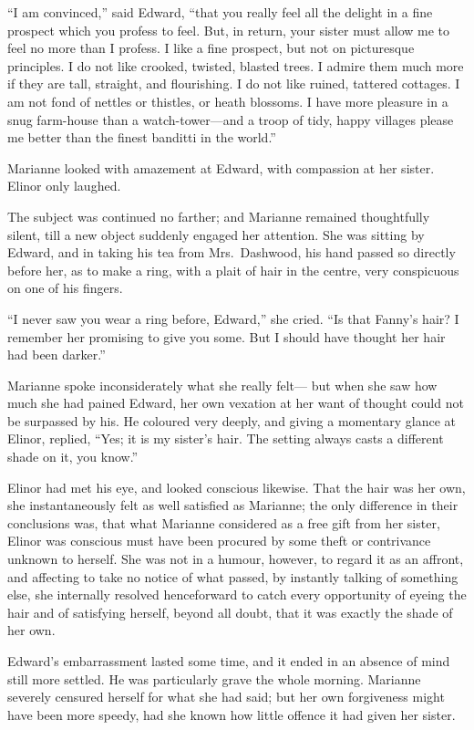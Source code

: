 ``I am convinced,'' said Edward, ``that you really feel
all the delight in a fine prospect which you profess
to feel.  But, in return, your sister must allow me
to feel no more than I profess.  I like a fine prospect,
but not on picturesque principles.  I do not like crooked,
twisted, blasted trees.  I admire them much more if they
are tall, straight, and flourishing.  I do not like ruined,
tattered cottages.  I am not fond of nettles or thistles,
or heath blossoms.  I have more pleasure in a snug
farm-house than a watch-tower---and a troop of tidy,
happy villages please me better than the finest banditti
in the world.''

Marianne looked with amazement at Edward,
with compassion at her sister.  Elinor only laughed.

The subject was continued no farther; and Marianne
remained thoughtfully silent, till a new object suddenly
engaged her attention.  She was sitting by Edward, and
in taking his tea from Mrs.\ Dashwood, his hand passed
so directly before her, as to make a ring, with a plait
of hair in the centre, very conspicuous on one of his fingers.

``I never saw you wear a ring before, Edward,'' she cried.
``Is that Fanny's hair? I remember her promising to give
you some.  But I should have thought her hair had been darker.''

Marianne spoke inconsiderately what she really felt---%
but when she saw how much she had pained Edward, her own
vexation at her want of thought could not be surpassed
by his.  He coloured very deeply, and giving a momentary
glance at Elinor, replied, ``Yes; it is my sister's hair.
The setting always casts a different shade on it,
you know.''

Elinor had met his eye, and looked conscious likewise.
That the hair was her own, she instantaneously felt as
well satisfied as Marianne; the only difference in their
conclusions was, that what Marianne considered as a free
gift from her sister, Elinor was conscious must have been
procured by some theft or contrivance unknown to herself.
She was not in a humour, however, to regard it as an affront,
and affecting to take no notice of what passed,
by instantly talking of something else, she internally
resolved henceforward to catch every opportunity of eyeing
the hair and of satisfying herself, beyond all doubt,
that it was exactly the shade of her own.

Edward's embarrassment lasted some time, and it
ended in an absence of mind still more settled.
He was particularly grave the whole morning.
Marianne severely censured herself for what she had said;
but her own forgiveness might have been more speedy,
had she known how little offence it had given her sister.

